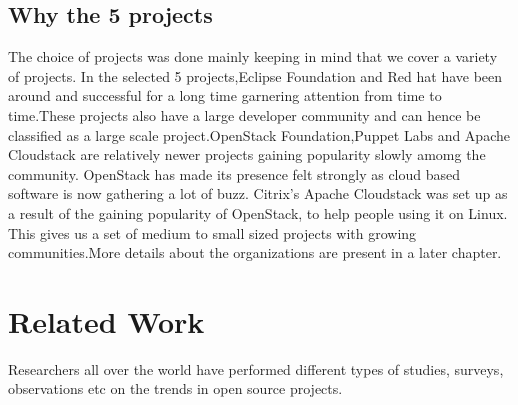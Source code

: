 \documentclass[double,12pt]{beavtex}
\begin{document}
\section{Why the 5 projects}
The choice of projects was done mainly keeping in mind that we cover a variety of projects. In the selected 5 projects,Eclipse Foundation and Red hat have been around and successful for a long time garnering attention from time to time.These projects also have a large developer community and can hence be classified as a large scale project.OpenStack Foundation,Puppet Labs and Apache Cloudstack are relatively newer projects gaining popularity slowly amomg the community. OpenStack has made its presence felt strongly as cloud based software is now gathering a lot of buzz. Citrix's Apache Cloudstack was set up as a result of the gaining popularity of OpenStack, to help people using it on Linux. This gives us a set of medium to small sized projects with growing communities.More details about the organizations are present in a later chapter.

\chapter{Related Work}
Researchers all over the world have performed different types of studies, surveys, observations etc on the trends in open source projects.
\end{document}
